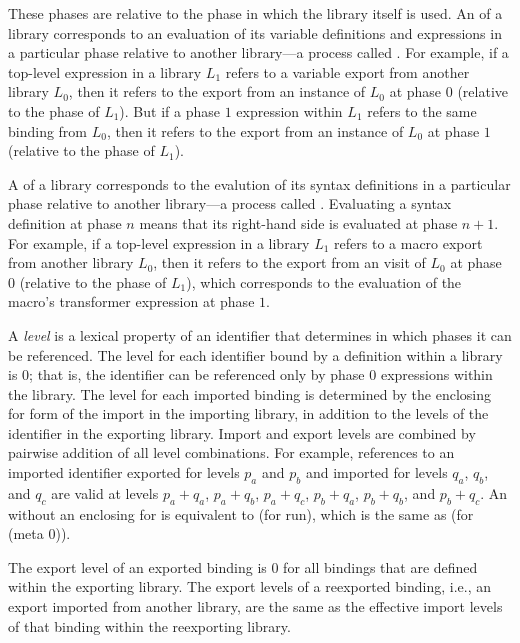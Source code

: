 These phases are relative to the phase in which the library itself is
used.
An  of a library corresponds to an evaluation of its
variable definitions and expressions in a particular phase relative to another
library---a process called .
For example, if a top-level expression in a library $L_1$ refers to
a variable export from another library $L_0$, then it refers to the export from an
instance of $L_0$ at phase $0$ (relative to the phase of $L_1$).
But if a phase $1$ expression within $L_1$ refers to the same binding from
$L_0$, then it refers to the export from an instance of $L_0$ at phase $1$
(relative to the phase of $L_1$).

A  of a library corresponds to the evalution of its syntax
definitions in a particular phase relative to another
library---a process called . Evaluating a syntax definition
at phase $n$ means that its right-hand side is evaluated at phase $n+1$.
For example, if a top-level expression in a library $L_1$ refers to
a macro export from another library $L_0$, then it refers to the export from an
visit of $L_0$ at phase $0$ (relative to the phase of $L_1$), which corresponds
to the evaluation of the macro's transformer expression at phase $1$.


%
A \emph{level} is a lexical property of an identifier that determines
in which phases it can be referenced. The level for each identifier
bound by a definition within a library is $0$; that is, the identifier
can be referenced only by phase $0$ expressions within the library.
The level for each imported binding is determined by the enclosing {\cf
  for} form of the {\cf import} in the importing library, in
addition to the levels of the identifier in the exporting
library. Import and export levels are combined by pairwise addition of
all level combinations.  For example, references to an imported
identifier exported for levels $p_a$ and $p_b$ and imported for levels
$q_a$, $q_b$, and $q_c$ are valid at levels $p_a+q_a$, $p_a+q_b$,
$p_a+q_c$, $p_b+q_a$, $p_b+q_b$, and $p_b+q_c$. An 
without an enclosing {\cf for} is equivalent to {\cf (for
   run)}, which is the same as {\cf (for
   (meta 0))}.

The export level of an exported binding is $0$ for all bindings
that are defined within the exporting library. The export levels of a
reexported binding, i.e., an export imported from another library, are the
same as the effective import levels of that binding within the reexporting
library.

